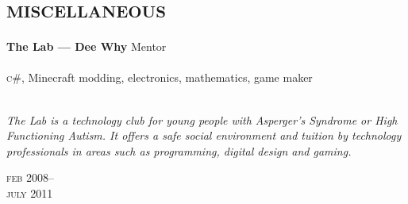 

\section*{\textsc{miscellaneous}}
\vspace{-0.2cm}

\begin{minipage}[t]{0.75\textwidth}
\textbf{The Lab --- Dee Why}\phantom{..} Mentor \\
\\
\textsc{c\#}, Minecraft modding, electronics, mathematics, game maker
\\
\\
{\small
\textit{The Lab is a technology club for young people with Asperger’s Syndrome or High Functioning Autism. It offers a safe social environment and tuition by technology professionals in areas such as programming, digital design and gaming.}
\par}
\end{minipage}
\begin{minipage}[t]{0.25\textwidth}
{
\hfill \textsc{feb} 2008--\\ 
\hspace*{0pt} \hfill \textsc{july} 2011
\par
}
\end{minipage}
\vspace{-0.3cm}


